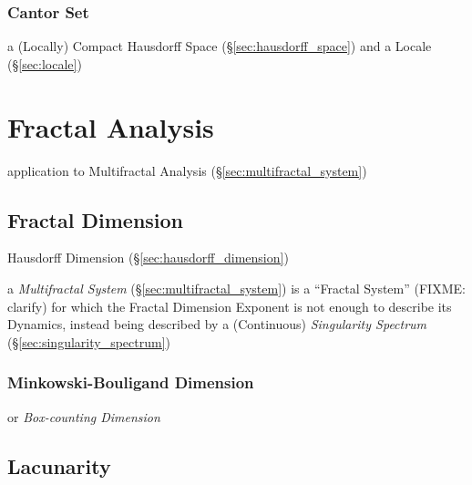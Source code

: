 \subsubsection{Cantor Set}\label{sec:cantor_set}

a (Locally) Compact Hausdorff Space (\S\ref{sec:hausdorff_space}) and a Locale
(\S\ref{sec:locale})



\section{Fractal Analysis}\label{sec:fractal_analysis}

application to Multifractal Analysis (\S\ref{sec:multifractal_system})



\subsection{Fractal Dimension}\label{sec:fractal_dimension}

Hausdorff Dimension (\S\ref{sec:hausdorff_dimension})

\fist a \emph{Multifractal System} (\S\ref{sec:multifractal_system}) is a
``Fractal System'' (FIXME: clarify) for which the Fractal Dimension Exponent is
not enough to describe its Dynamics, instead being described by a (Continuous)
\emph{Singularity Spectrum} (\S\ref{sec:singularity_spectrum})



\subsubsection{Minkowski-Bouligand Dimension}\label{sec:minkowski_bouligand}

or \emph{Box-counting Dimension}



\subsection{Lacunarity}\label{sec:lacunarity}

